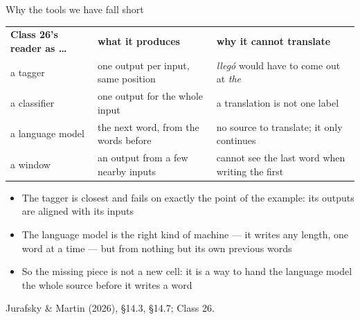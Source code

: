 \documentclass[aspectratio=169, 11pt]{beamer}
\newcommand{\srcline}[1]{%
  \par\vspace{0.25em}%
  {\scriptsize\color{mcMuted}\hfill #1\par}}
\newcommand{\src}[3]{}      %
\begin{document}
\begin{frame}{Why the tools we have fall short}
  \src{jurafsky_slp3}{section}{14.3}
  \src{jurafsky_slp3}{section}{14.7}
  \vspace{-0.1em}
  {\scriptsize
  \renewcommand{\arraystretch}{1.3}
  \begin{tabular}{@{}l@{\hspace{1.0em}}l@{\hspace{1.0em}}l@{}}
    \textbf{Class 26's reader as \ldots} & \textbf{what it produces} & \textbf{why it cannot translate}\\
    a tagger & one output per input, same position & \emph{lleg\'o} would have to come out at \emph{the}\\
    a classifier & one output for the whole input & a translation is not one label\\
    a language model & the next word, from the words before & no source to translate; it only continues\\
    a window & an output from a few nearby inputs & cannot see the last word when writing the first\\
  \end{tabular}}
  \vspace{0.4em}

  {\footnotesize
  \begin{itemize}\itemsep0.2em
    \item The tagger is closest and fails on exactly the point of the
          example: its outputs are \alert{aligned} with its inputs
    \item The language model is the right kind of machine --- it
          \alert{writes} any length, one word at a time --- but from nothing
          but its own previous words
    \item So the missing piece is not a new cell: it is a way to hand the
          language model \alert{the whole source} before it writes a word
  \end{itemize}}
  \srcline{Jurafsky \& Martin (2026), \S14.3, \S14.7; Class 26.}
\end{frame}
\end{document}
